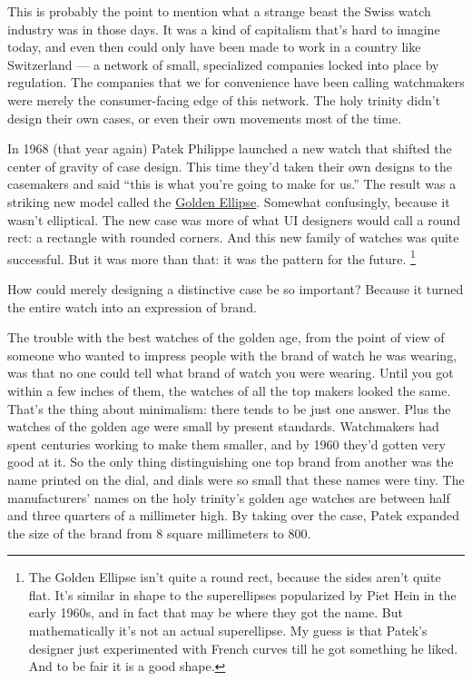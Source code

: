 \documentclass[12pt]{book}
\begin{document}
This is probably the point to mention what a strange beast the Swiss
watch industry was in those days. It was a kind of capitalism that's
hard to imagine today, and even then could only have been made to work
in a country like Switzerland --- a network of small, specialized
companies locked into place by regulation. The companies that we for
convenience have been calling watchmakers were merely the
consumer-facing edge of this network. The holy trinity didn't design
their own cases, or even their own movements most of the time.

In 1968 (that year again) Patek Philippe launched a new watch that
shifted the center of gravity of case design. This time they'd taken
their own designs to the casemakers and said ``this is what you're going
to make for us.'' The result was a striking new model called the
\href{https://collectability.com/learn/the-history-of-the-golden-ellipse/}{Golden
Ellipse}. Somewhat confusingly, because it wasn't elliptical. The new
case was more of what UI designers would call a round rect: a rectangle
with rounded corners. And this new family of watches was quite
successful. But it was more than that: it was the pattern for the
future. \footnote{The Golden Ellipse isn't quite a round rect, because the sides
aren't quite flat. It's similar in shape to the superellipses
popularized by Piet Hein in the early 1960s, and in fact that may be
where they got the name. But mathematically it's not an actual
superellipse. My guess is that Patek's designer just experimented with
French curves till he got something he liked. And to be fair it is a
good shape.}

How could merely designing a distinctive case be so important? Because
it turned the entire watch into an expression of brand.

The trouble with the best watches of the golden age, from the point of
view of someone who wanted to impress people with the brand of watch he
was wearing, was that no one could tell what brand of watch you were
wearing. Until you got within a few inches of them, the watches of all
the top makers looked the same. That's the thing about minimalism: there
tends to be just one answer. Plus the watches of the golden age were
small by present standards. Watchmakers had spent centuries working to
make them smaller, and by 1960 they'd gotten very good at it. So the
only thing distinguishing one top brand from another was the name
printed on the dial, and dials were so small that these names were tiny.
The manufacturers' names on the holy trinity's golden age watches are
between half and three quarters of a millimeter high. By taking over the
case, Patek expanded the size of the brand from 8 square millimeters to
800.
\end{document}
